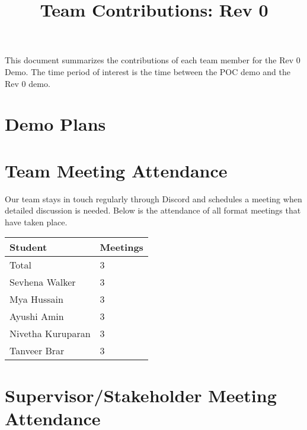 \documentclass{article}
\title{Team Contributions: Rev 0\\\progname}
\author{\authname}
\date{}
\begin{document}
\maketitle

This document summarizes the contributions of each team member for the Rev 0
Demo.  The time period of interest is the time between the POC demo and the Rev
0 demo.

\section{Demo Plans}


\section{Team Meeting Attendance}

Our team stays in touch regularly through Discord and schedules a
meeting when detailed discussion is needed. Below is the attendance
of all format meetings that have taken place.


\begin{table}[H]
  \centering
  \begin{tabular}{ll}
    \toprule
    \textbf{Student} & \textbf{Meetings}\\
    \midrule
    Total & 3\\
    Sevhena Walker & 3\\
    Mya Hussain & 3\\
    Ayushi Amin & 3\\
    Nivetha Kuruparan & 3\\
    Tanveer Brar & 3\\
    \bottomrule
  \end{tabular}
\end{table}


\section{Supervisor/Stakeholder Meeting Attendance}
\end{document}
